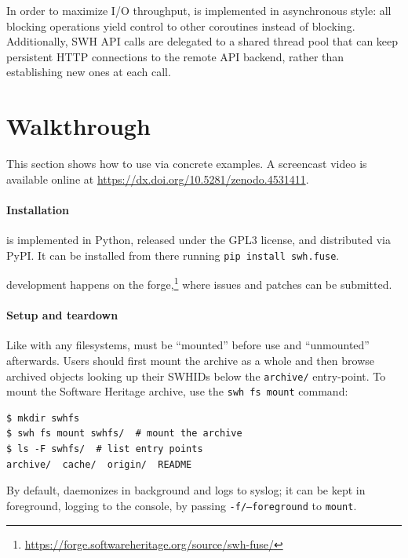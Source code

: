 In order to maximize I/O throughput, \SWHFS{} is implemented in asynchronous
style:
all blocking operations yield control to other coroutines instead of blocking.
%
Additionally, SWH API calls are delegated to a shared thread pool that can keep
persistent HTTP connections to the remote API backend, rather than establishing
new ones at each call.


\section{Walkthrough}%
\label{sec:fuse-walkthrough}

This section shows how to use \SWHFS{} via concrete examples. A screencast video
is available online at \url{https://dx.doi.org/10.5281/zenodo.4531411}.

\paragraph{Installation}

\SWHFS{} is implemented in Python, released under the GPL3 license, and
distributed via PyPI\@.
It can be installed from there running \texttt{pip install swh.fuse}.

\SWHFS{} development happens on the \SWH{}
forge,\footnote{\url{https://forge.softwareheritage.org/source/swh-fuse/}}
where issues and patches can be submitted.

\paragraph{Setup and teardown}

Like with any filesystems, \SWHFS{} must be ``mounted'' before use and
``unmounted'' afterwards. Users should first mount the \SWH{} archive as a whole
and then browse archived objects looking up their SWHIDs below the
\texttt{archive/} entry-point. To mount the Software Heritage archive, use the
\texttt{swh fs mount} command:

\begin{verbatim}
$ mkdir swhfs
$ swh fs mount swhfs/  # mount the archive
$ ls -F swhfs/  # list entry points
archive/  cache/  origin/  README
\end{verbatim}

By default, \SWHFS{} daemonizes in background and logs to syslog; it can be kept
in foreground, logging to the console, by passing \texttt{-f/--foreground} to
\texttt{mount}.

